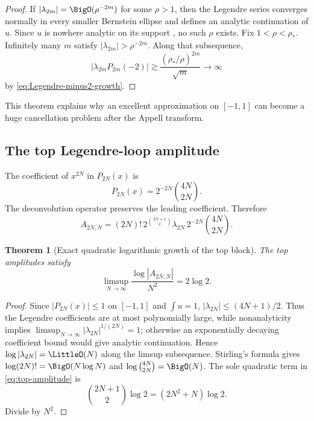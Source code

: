 \documentclass[11pt,oneside]{article}
\newtheorem{theorem}{Theorem}[section]
\theoremstyle{definition}
\theoremstyle{remark}
\newcommand{\rhozero}{\rho_{\!*}}
\begin{document}
\begin{proof}
If $|\lambda_{2m}|=\BigO(\rho^{-2m})$ for some $\rho>1$, then the Legendre
series converges normally in every smaller Bernstein ellipse and defines an
analytic continuation of $u$.  Since $u$ is nowhere analytic on its support
\cite{ReshetnikovPrimary}, no such $\rho$ exists.  Fix
$1<\rho<\rhozero$.  Infinitely many $m$ satisfy
$|\lambda_{2m}|>\rho^{-2m}$.  Along that subsequence,
\[
 |\lambda_{2m}P_{2m}(-2)|
 \gtrsim\frac{(\rhozero/\rho)^{2m}}{\sqrt m}\to\infty
\]
by \eqref{eq:Legendre-minus2-growth}.
\end{proof}

This theorem explains why an excellent approximation on $[-1,1]$ can become
a huge cancellation problem after the Appell transform.

\subsection{The top Legendre-loop amplitude}
The coefficient of $x^{2N}$ in $P_{2N}(x)$ is
\begin{equation}
 [x^{2N}]P_{2N}(x)=2^{-2N}\binom{4N}{2N}.
 \label{eq:Legendre-leading}
\end{equation}
The deconvolution operator preserves the leading coefficient.  Therefore
\begin{equation}
 A_{2N,N}
 =(2N)!\,2^{\binom{2N+1}{2}}
 \lambda_{2N}\,2^{-2N}\binom{4N}{2N}.
 \label{eq:top-amplitude}
\end{equation}

\begin{theorem}[Exact quadratic logarithmic growth of the top block]
\label{thm:top-growth}
The top amplitudes satisfy
\begin{equation}
 \boxed{
 \limsup_{N\to\infty}
 \frac{\log|A_{2N,N}|}{N^2}=2\log2.}
 \label{eq:top-growth-limsup}
\end{equation}
\end{theorem}

\begin{proof}
Since $|P_{2N}(x)|\le1$ on $[-1,1]$ and $\int u=1$,
$|\lambda_{2N}|\le(4N+1)/2$.  Thus the Legendre coefficients are at most
polynomially large, while nonanalyticity implies
$\limsup_{N\to\infty}|\lambda_{2N}|^{1/(2N)}=1$; otherwise an exponentially
decaying coefficient bound would give analytic continuation.  Hence
$\log|\lambda_{2N}|=\LittleO(N)$ along the limsup subsequence.  Stirling's
formula gives $\log(2N)!=\BigO(N\log N)$ and
$\log\binom{4N}{2N}=\BigO(N)$.  The sole quadratic term in
\eqref{eq:top-amplitude} is
\[
 \binom{2N+1}{2}\log2=(2N^2+N)\log2.
\]
Divide by $N^2$.
\end{proof}
\end{document}
